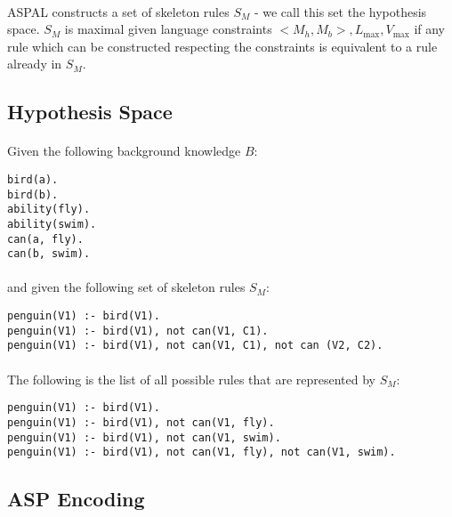 \documentclass{article}
\theoremstyle{plain}
\theoremstyle{definition}
\begin{document}
\begin{multicols}{2}
\paragraph{} ASPAL constructs a set of skeleton rules $S_M$ - we call this set the hypothesis space. $S_M$ is maximal given language constraints $<M_h, M_b>, L_\text{max}, V_\text{max}$ if any rule which can be constructed respecting the constraints is equivalent to a rule already in $S_M$.

\subsection{Hypothesis Space}\label{sec:ASPALHypothesisSpace}

\paragraph{} Given the following background knowledge $B$:

\begin{lstlisting}
bird(a).
bird(b).
ability(fly).
ability(swim).
can(a, fly).
can(b, swim).
\end{lstlisting}

\paragraph{} and given the following set of skeleton rules $S_M$:

\begin{lstlisting}
penguin(V1) :- bird(V1).
penguin(V1) :- bird(V1), not can(V1, C1).
penguin(V1) :- bird(V1), not can(V1, C1), not can (V2, C2).
\end{lstlisting}

\paragraph{} The following is the list of all possible rules that are represented by $S_M$:

\begin{lstlisting}
penguin(V1) :- bird(V1).
penguin(V1) :- bird(V1), not can(V1, fly).
penguin(V1) :- bird(V1), not can(V1, swim).
penguin(V1) :- bird(V1), not can(V1, fly), not can(V1, swim).
\end{lstlisting}

\subsection{ASP Encoding}


\end{multicols}
\end{document}
